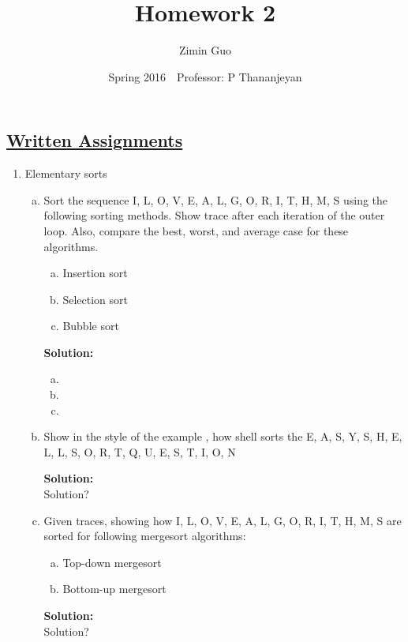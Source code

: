\documentclass{article}\usepackage{amsmath,amssymb,amsthm,tikz,tkz-graph,color,chngpage,soul,hyperref,csquotes,graphicx,floatrow}\newcommand*{\QEDB}{\hfill\ensuremath{\square}}\newtheorem*{prop}{Proposition}\renewcommand{\theenumi}{\alph{enumi}}\usepackage[shortlabels]{enumitem}\usepackage[nobreak=true]{mdframed}\usetikzlibrary{matrix,calc}\MakeOuterQuote{"}\usepackage[margin=0.75in]{geometry} \newtheorem{theorem}{Theorem}
\title{Homework 2}
\author{Zimin Guo }
\date{Spring 2016$\quad$Professor: P Thananjeyan}
\begin{document}
\maketitle


\subsection*{\underline{Written Assignments}}
\begin{enumerate}[1.]
\item Elementary sorts
\begin{enumerate}[a)]
\item Sort the sequence I, L, O, V, E, A, L, G, O, R, I, T, H, M, S using the following sorting methods. Show trace after each iteration of the outer loop. Also, compare the best, worst, and average case for these algorithms.
\begin{enumerate}[a.]
\item Insertion sort
\item Selection sort
\item Bubble sort
\end{enumerate}
\begin{mdframed}
\textbf{Solution:} 
\begin{enumerate}[a.]
\item
\item
\item
\end{enumerate}
\end{mdframed}

\item Show in the style of the example , how shell sorts the E, A, S, Y, S, H, E, L, L, S, O, R, T, Q, U, E, S, T, I, O, N
\begin{mdframed}
\textbf{Solution:} \\
Solution?
\end{mdframed}

\item Given traces, showing how I, L, O, V, E, A, L, G, O, R, I, T, H, M, S are sorted for following mergesort algorithms:
\begin{enumerate}[a.]
\item Top-down mergesort
\item Bottom-up mergesort
\end{enumerate}
\begin{mdframed}
\textbf{Solution:} \\
Solution?
\end{mdframed}


\end{enumerate}
\end{enumerate}
\end{document}
